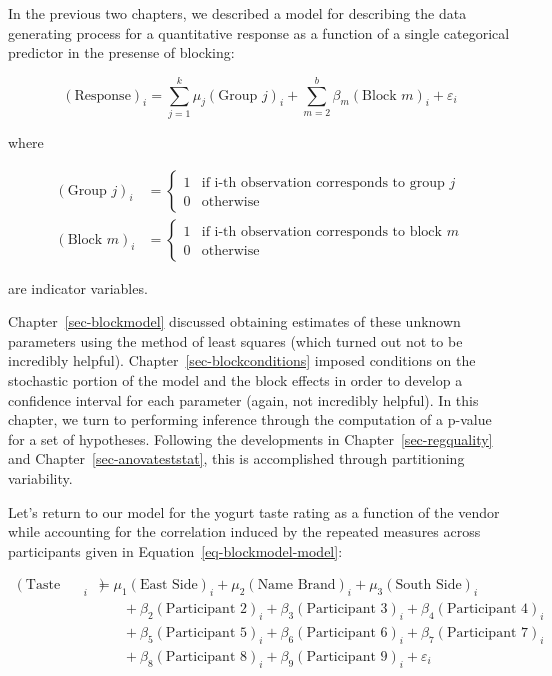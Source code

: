 \documentclass[
  letterpaper,
  DIV=11,
  numbers=noendperiod]{scrreprt}
\theoremstyle{plain}
\theoremstyle{definition}
\theoremstyle{definition}
\theoremstyle{remark}
\begin{document}
In the previous two chapters, we described a model for describing the
data generating process for a quantitative response as a function of a
single categorical predictor in the presense of blocking:

\[(\text{Response})_i = \sum_{j=1}^{k} \mu_j (\text{Group } j)_i + \sum_{m=2}^{b} \beta_m (\text{Block } m)_i + \varepsilon_i\]

where

\[
\begin{aligned}
  (\text{Group } j)_i 
    &= \begin{cases} 1 & \text{if i-th observation corresponds to group } j \\ 0 & \text{otherwise} \end{cases} \\
  (\text{Block } m)_i
    &= \begin{cases} 1 & \text{if i-th observation corresponds to block } m \\ 0 & \text{otherwise} \end{cases}
\end{aligned}
\]

are indicator variables.

Chapter~\ref{sec-blockmodel} discussed obtaining estimates of these
unknown parameters using the method of least squares (which turned out
not to be incredibly helpful). Chapter~\ref{sec-blockconditions} imposed
conditions on the stochastic portion of the model and the block effects
in order to develop a confidence interval for each parameter (again, not
incredibly helpful). In this chapter, we turn to performing inference
through the computation of a p-value for a set of hypotheses. Following
the developments in Chapter~\ref{sec-regquality} and
Chapter~\ref{sec-anovateststat}, this is accomplished through
partitioning variability.

Let's return to our model for the yogurt taste rating as a function of
the vendor while accounting for the correlation induced by the repeated
measures across participants given in
Equation~\ref{eq-blockmodel-model}:

\[
\begin{aligned}
  (\text{Taste Rating})_i &= \mu_1 (\text{East Side})_i + \mu_2 (\text{Name Brand})_i + \mu_3 (\text{South Side})_i \\
    &\qquad + \beta_2 (\text{Participant 2})_i + \beta_3 (\text{Participant 3})_i + \beta_4 (\text{Participant 4})_i \\
    &\qquad + \beta_5 (\text{Participant 5})_i + \beta_6 (\text{Participant 6})_i + \beta_7 (\text{Participant 7})_i \\
    &\qquad + \beta_8 (\text{Participant 8})_i + \beta_9 (\text{Participant 9})_i + \varepsilon_i
\end{aligned}
\]
\end{document}
